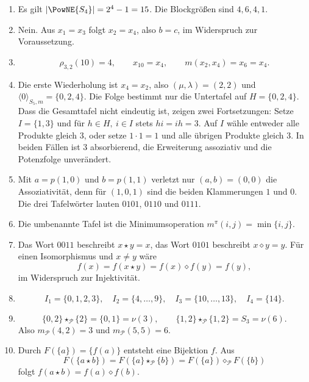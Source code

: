 \documentclass[main.tex]{subfiles}
\begin{document}
\begin{enumerate}
  \item Es gilt \(|\PowNE{S_4}|=2^4-1=15\).  Die Blockgrößen sind
    \(4,6,4,1\).

  \item Nein.  Aus \(x_1=x_3\) folgt \(x_2=x_4\), also \(b=c\), im
    Widerspruch zur Voraussetzung.

  \item
    \[
      \rho_{3,2}(10)=4,\qquad x_{10}=x_4,\qquad
      m(x_2,x_4)=x_6=x_4.
    \]

  \item Die erste Wiederholung ist \(x_4=x_2\), also
    \((\mu,\lambda)=(2,2)\) und
    \(\langle0\rangle_{S_5,m}=\{0,2,4\}\).  Die Folge bestimmt nur die Untertafel auf
    \(H=\{0,2,4\}\).  Dass die Gesamttafel nicht eindeutig ist, zeigen zwei
    Fortsetzungen: Setze \(I=\{1,3\}\) und für \(h\in H,\ i\in I\) stets
    \(hi=ih=3\).  Auf \(I\) wähle entweder alle Produkte gleich \(3\), oder
    setze \(1\cdot1=1\) und alle übrigen Produkte gleich \(3\).  In beiden
    Fällen ist \(3\) absorbierend, die Erweiterung assoziativ und die
    Potenzfolge unverändert.

  \item Mit \(a=p(1,0)\) und \(b=p(1,1)\) verletzt nur
    \((a,b)=(0,0)\) die Assoziativität, denn für \((1,0,1)\) sind die beiden
    Klammerungen \(1\) und \(0\).  Die drei Tafelwörter lauten
    \(0101\), \(0110\) und \(0111\).

  \item Die umbenannte Tafel ist die Minimumsoperation
    \(m^\pi(i,j)=\min\{i,j\}\).

  \item Das Wort \(0011\) beschreibt \(x\star y=x\), das Wort \(0101\)
    beschreibt \(x\diamond y=y\).  Für einen Isomorphismus und
    \(x\neq y\) wäre
    \[
      f(x)=f(x\star y)=f(x)\diamond f(y)=f(y),
    \]
    im Widerspruch zur Injektivität.

  \item
    \[
      I_1=\{0,1,2,3\},\quad
      I_2=\{4,\ldots,9\},\quad
      I_3=\{10,\ldots,13\},\quad
      I_4=\{14\}.
    \]

  \item
    \[
      \{0,2\}\star_{\mathcal P}\{2\}=\{0,1\}=\nu(3),
      \qquad
      \{1,2\}\star_{\mathcal P}\{1,2\}=S_3=\nu(6).
    \]
    Also \(m_{\mathcal P}(4,2)=3\) und
    \(m_{\mathcal P}(5,5)=6\).

  \item Durch \(F(\{a\})=\{f(a)\}\) entsteht eine Bijektion \(f\).  Aus
    \[
      F(\{a\star b\})
      =
      F(\{a\}\star_{\mathcal P}\{b\})
      =
      F(\{a\})\diamond_{\mathcal P}F(\{b\})
    \]
    folgt \(f(a\star b)=f(a)\diamond f(b)\).


\end{enumerate}
\end{document}
